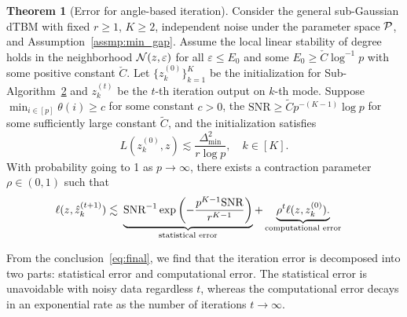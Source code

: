 \documentclass[journal]{IEEEtran}
\theoremstyle{definition}
\newtheorem{thm}{Theorem}
\theoremstyle{definition}
\newcommand{\of}[1]{\left(#1\right)}
\newcommand*{\KeepStyleUnderBrace}[1]{%
  \mathop{%
    \mathchoice
    {\underbrace{\displaystyle#1}}%
    {\underbrace{\textstyle#1}}%
    {\underbrace{\scriptstyle#1}}%
    {\underbrace{\scriptscriptstyle#1}}%
  }\limits
}
\begin{document}
\begin{thm}[Error for angle-based iteration]\label{thm:refinement} Consider the general sub-Gaussian dTBM with {fixed $r \geq 1$, $K \geq 2$}, independent noise under the parameter space $\mathcal{P}$, and Assumption~\ref{assmp:min_gap}. {Assume the local linear stability of degree holds in the neighborhood $\mathcal{N}(z,\varepsilon)$ for all $\varepsilon \leq E_0$ and some $E_0 \geq \check{C}\log^{-1}p $ with some positive constant $\check{C}$.}
Let $\{z^{(0)}_k\}_{k=1}^K$ be the initialization for Sub-Algorithm~\hyperref[alg:main]{2} and $z^{(t)}_k$ be the $t$-th iteration output on $k$-th mode. Suppose $\min_{i \in [p]}\theta(i) \geq c $ for some {constant} $c > 0$, the $\text{SNR} \geq \tilde C p^{-(K-1)}\log p$ for some sufficiently large constant $\tilde C$, and the initialization satisfies 
\begin{equation}
    L(z^{(0)}_k, z) \lesssim \frac{\Delta_{\min}^2}{r \log p}, \quad k \in [K].
\end{equation}
 With probability going to 1 {as $p \rightarrow \infty$}, there exists a contraction parameter $\rho \in (0,1)$ such that 
 \small
\begin{align}\label{eq:final}
    \ell(z, \hat z^{(t+1)}_k) \lesssim &\ \KeepStyleUnderBrace{
   \text{SNR}^{-1}
    \exp\of{- \frac{p^{K-1}\text{SNR}}{r^{K-1}}}}_{\substack{\text{statistical error}} }+ \KeepStyleUnderBrace{ \rho^t \ell(z, z^{(0)}_k). }_{\substack{\text{computational error}}}
\end{align}
\normalsize
\end{thm}
From the conclusion~\eqref{eq:final}, we find that the iteration error is decomposed into two parts: statistical error and computational error. The statistical error is unavoidable with noisy data regardless $t$, whereas the computational error decays in an exponential rate as the number of iterations $t \rightarrow \infty$. 
\end{document}
